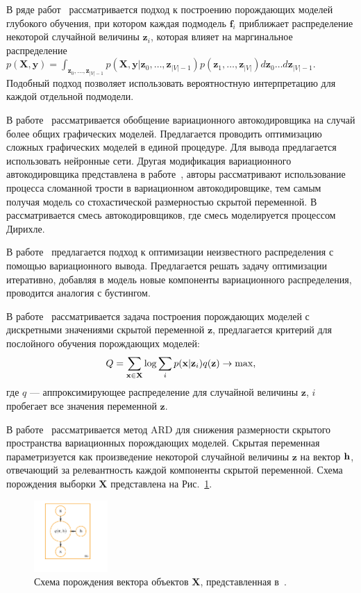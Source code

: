 В ряде работ~\cite{vae_graph,vae_stick,vae_mix,var_boost,layerwise_optimal} рассматривается подход к построению порождающих моделей глубокого обучения, при котором каждая подмодель $\mathbf{f}_i$ приближает распределение некоторой случайной величины $\mathbf{z}_i$, которая влияет на маргинальное распределение $p(\mathbf{X}, \mathbf{y}) = \int_{\mathbf{z}_0, \dots, \mathbf{z}_{|V|-1}} p(\mathbf{X}, \mathbf{y}|\mathbf{z}_0, \dots, \mathbf{z}_{|V|-1})p(\mathbf{z}_1, \dots, \mathbf{z}_{|V|})d\mathbf{z}_0\dots d\mathbf{z}_{|V|-1}.$ Подобный подход позволяет использовать вероятностную интерпретацию для каждой отдельной подмодели. 

В работе~\cite{vae_graph} рассматривается обобщение вариационного автокодировщика на случай более общих графических моделей. Предлагается проводить оптимизацию сложных графических моделей в единой процедуре. Для вывода предлагается использовать нейронные сети.
Другая модификация вариационного автокодировщика представлена в работе~\cite{vae_stick}, авторы рассматривают использование процесса сломанной трости в вариационном автокодировщике, тем самым получая модель со стохастической размерностью скрытой переменной. В~\cite{vae_mix} рассматривается смесь автокодировщиков, где смесь моделируется процессом Дирихле.

В работе~\cite{var_boost} предлагается подход к оптимизации неизвестного распределения с помощью вариационного вывода. Предлагается решать задачу оптимизации итеративно, добавляя в модель новые компоненты вариационного распределения, проводится аналогия с бустингом.

В работе~\cite{layerwise_optimal} рассматривается задача построения порождающих моделей с дискретными значениями скрытой переменной $\mathbf{z}$, предлагается критерий для послойного обучения порождающих моделей:
\[
    Q = \sum_{\mathbf{x} \in \mathbf{X}} \text{log} \sum_{i}p(\mathbf{x}|\mathbf{z}_i)q(\mathbf{z}) \to \max,
\]
где $q$ --- аппроксимирующее распределение для случайной величины $\mathbf{z}$, $i$ пробегает все значения переменной $\mathbf{z}$.   

В работе~\cite{vae_ard} рассматривается метод ARD для снижения размерности скрытого пространства вариационных порождающих моделей. Скрытая переменная параметризуется как  произведение некоторой случайной величины $\mathbf{z}$  на вектор $\mathbf{h}$, отвечающий за релевантность каждой компоненты скрытой переменной. Схема порождения выборки $\mathbf{X}$ представлена на Рис.~\ref{fig:vae_ard}.

\begin{figure}[H]
\centering
\includegraphics[width=0.25\textwidth]{./plots/notebooks/ae_plate.pdf}
\caption{Схема порождения вектора объектов $\mathbf{X}$, представленная в~\cite{vae_ard}.}
\label{fig:vae_ard}

\end{figure}

